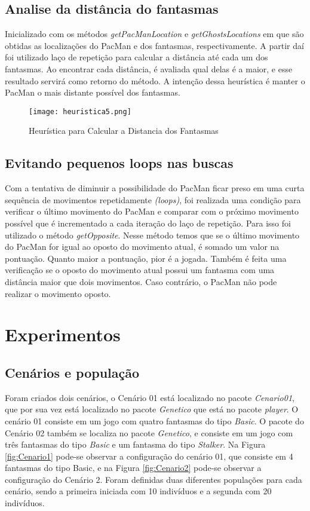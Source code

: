\documentclass[12pt, a4paper, english, brazil]{abntex2}
\begin{document}
    \section{Analise da distância do fantasmas}
Inicializado com os métodos \textit{getPacManLocation} e \textit{getGhostsLocations} em que são obtidas as localizações do PacMan e dos fantasmas, respectivamente. A partir daí foi utilizado laço de repetição para calcular a distância até cada um dos fantasmas. Ao encontrar cada distância, é avaliada qual delas é a maior, e esse resultado servirá como retorno do método. A intenção dessa heurística é manter o PacMan o mais distante possível dos fantasmas.
\begin{figure}[H]
\centering
\caption{Heurística para Calcular a Distancia dos Fantasmas}
\texttt{[image: heuristica5.png]}
\label{fig:heuristica5}
\end{figure}
 


    \section{Evitando pequenos loops nas buscas}
Com a tentativa de diminuir a possibilidade do PacMan ficar preso em uma curta sequência de movimentos repetidamente \textit{(loops)}, foi realizada uma condição para verificar o último movimento do PacMan e comparar com o próximo movimento possível que é incrementado a cada iteração do laço de repetição. Para isso foi utilizado o método \textit{getOpposite}. 
Nesse método temos que se o último movimento do PacMan for igual ao oposto do movimento atual, é somado um valor na pontuação. Quanto maior a pontuação, pior é a jogada. Também é feita uma verificação se o oposto do movimento atual possui um fantasma com uma distância maior que dois movimentos. Caso contrário, o PacMan não pode realizar o movimento oposto. 



\chapter{Experimentos}

\section{Cenários e população}
\label{section:cenarios}
Foram criados dois cenários, o Cenário 01 está localizado no pacote \textit{Cenario01}, que por sua vez está localizado no pacote \textit{Genetico} que está no pacote \textit{player}. O cenário 01 consiste em um jogo com quatro fantasmas do tipo \textit{Basic}. O pacote do Cenário 02 também se localiza no pacote \textit{Genetico}, e consiste em um jogo com três fantasmas do tipo \textit{Basic} e um fantasma do tipo \textit{Stalker}.
Na Figura \ref{fig:Cenario1} pode-se observar a configuração do cenário 01, que consiste em 4 fantasmas do tipo Basic, e na Figura \ref{fig:Cenario2} pode-se observar a configuração do Cenário 2. Foram definidas duas diferentes populações para cada cenário, sendo a primeira iniciada com 10 indivíduos e a segunda com 20 indivíduos. 
\end{document}
